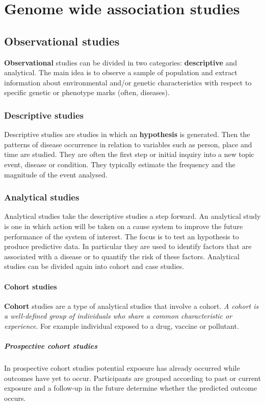 \graphicspath{{chapters/08/images/}}
\chapter{Genome wide association studies}

\section{Observational studies}
\textbf{Observational} studies can be divided in two categories: \textbf{descriptive} and analytical.
The main idea is to observe a sample of population and extract information about environmental and/or genetic characteristics with respect to specific genetic or phenotype marks (often, diseases).

	\subsection{Descriptive studies}
	Descriptive studies are studies in which an \textbf{hypothesis} is generated.
	Then the patterns of disease occurrence in relation to variables such as person, place and time are studied.
	They are often the first step or initial inquiry into a new topic event, disease or condition.
	They typically estimate the frequency and the magnitude of the event analysed.

	\subsection{Analytical studies}
	Analytical studies take the descriptive studies a step forward.
	An analytical study is one in which action will be taken on a cause system to improve the future performance of the system of interest.
	The focus is to test an hypothesis to produce predictive data.
	In particular they are used to identify factors that are associated with a disease or to quantify the risk of these factors.
	Analytical studies can be divided again into cohort and case studies.

	\subsubsection{Cohort studies}
	\textbf{Cohort} studies are a type of analytical studies that involve a cohort.
	\textit{A cohort is a well-defined group of individuals who share a common characteristic or experience}.
	For example individual exposed to a drug, vaccine or pollutant.

		\paragraph{Prospective cohort studies}
		In prospective cohort studies potential exposure has already occurred while outcomes have yet to occur.
		Participants are grouped according to past or current exposure and a follow-up in the future determine whether the predicted outcome occurs.

